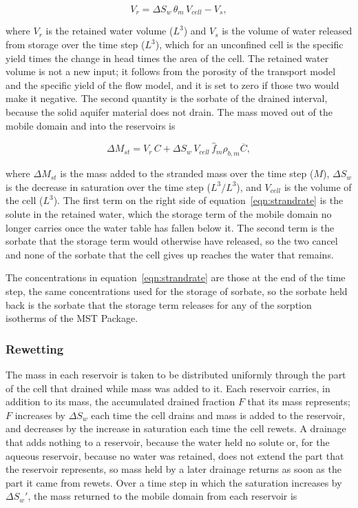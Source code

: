 \begin{equation}
\label{eqn:strandretained}
V_{r} = \Delta S_w \, \theta_m \, V_{cell} - V_{s} ,
\end{equation}

\noindent where $V_{r}$ is the retained water volume ($L^3$) and $V_{s}$ is the volume of water released from storage over the time step ($L^3$), which for an unconfined cell is the specific yield times the change in head times the area of the cell. The retained water volume is not a new input; it follows from the porosity of the transport model and the specific yield of the flow model, and it is set to zero if those two would make it negative. The second quantity is the sorbate of the drained interval, because the solid aquifer material does not drain. The mass moved out of the mobile domain and into the reservoirs is

\begin{equation}
\label{eqn:strandrate}
\Delta M_{st} = V_{r} \, C + \Delta S_w \, V_{cell} \, \hat{f}_m \rho_{b,m} \overline{C} ,
\end{equation}

\noindent where $\Delta M_{st}$ is the mass added to the stranded mass over the time step ($M$), $\Delta S_w$ is the decrease in saturation over the time step ($L^3/L^3$), and $V_{cell}$ is the volume of the cell ($L^3$). The first term on the right side of equation~\ref{eqn:strandrate} is the solute in the retained water, which the storage term of the mobile domain no longer carries once the water table has fallen below it. The second term is the sorbate that the storage term would otherwise have released, so the two cancel and none of the sorbate that the cell gives up reaches the water that remains.

The concentrations in equation~\ref{eqn:strandrate} are those at the end of the time step, the same concentrations used for the storage of sorbate, so the sorbate held back is the sorbate that the storage term releases for any of the sorption isotherms of the MST Package.

\subsubsection{Rewetting}

The mass in each reservoir is taken to be distributed uniformly through the part of the cell that drained while mass was added to it. Each reservoir carries, in addition to its mass, the accumulated drained fraction $F$ that its mass represents; $F$ increases by $\Delta S_w$ each time the cell drains and mass is added to the reservoir, and decreases by the increase in saturation each time the cell rewets. A drainage that adds nothing to a reservoir, because the water held no solute or, for the aqueous reservoir, because no water was retained, does not extend the part that the reservoir represents, so mass held by a later drainage returns as soon as the part it came from rewets. Over a time step in which the saturation increases by $\Delta S_w'$, the mass returned to the mobile domain from each reservoir is

